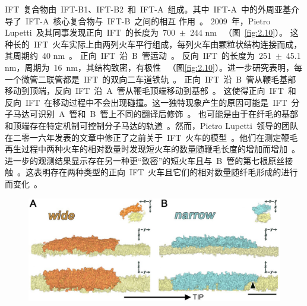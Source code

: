 IFT\ 复合物由\ IFT-B1、IFT-B2\ 和\ IFT-A\ 组成。其中\ IFT-A\ 中的外周亚基介导了\ IFT-A\ 核心复合物与\ IFT-B\ 之间的相互
作用\ \citep{Toriyama2016}。
2009\ 年，Pietro Lupetti\ 及其同事发现正向\ IFT\ 的长度为\ 700\ $\pm$\ 244 nm\ \citep{Pigino2009}
（图\ \ref{fig:2.10}）。 这种长的\ IFT\ 火车实际上由两列火车平行组成，每列火车由颗粒状结构连接而成，其周期约\ 40 nm\ \citep{Pigino2009}。 正向\ IFT\ 沿\ B\ 管运动\ \citep{Pigino2009,Stepanek2016}。 反向\ IFT\ 的长度为\ 251\ $\pm$\ 45.1 nm，周期为\ \SI{16}{\nm}，其结构致密，有极性\ \citep{Pigino2009} （图\ref{fig:2.10}）。进一步研究表明，每一个微管二联管都是\ IFT\ 的双向二车道铁轨\ \citep{Stepanek2016}。 正向\ IFT\ 沿\ B\ 管从鞭毛基部移动到顶端，反向\ IFT\ 沿\ A\ 管从鞭毛顶端移动到基部\ \citep{Stepanek2016}。 这使得正向\ IFT\ 和反向\ IFT\ 在移动过程中不会出现碰撞。这一独特现象产生的原因可能是\ IFT\ 分子马达可识别\ A\ 管和\ B\ 管上不同的翻译后修饰\ \citep{Stepanek2016}。 也可能是由于在纤毛的基部和顶端存在特定机制可控制分子马达的轨道\
\citep{Stepanek2016}。然而，Pietro Lupetti\ 领导的团队在二零一六年发表的文章中修正了之前关于\ IFT\ 火车的模型\ \citep{Vannuccini2016}。他们在测定鞭毛再生过程中两种火车的相对数量时发现短火车的数量随鞭毛长度的增加而增加\ \citep{Vannuccini2016}。进一步的观测结果显示存在另一种更“致密”的短火车且与\ B\ 管的第七根原丝接触\ \citep{Vannuccini2016}。这表明存在两种类型的正向\ IFT\ 火车且它们的相对数量随纤毛形成的进行而变化\
\citep{Vannuccini2016}。

\begin{figure}[htb]
\centering
\graphicspath{{figures/}}
\includegraphics[width=\textwidth]{fig2-11.jpg}
{
\par}
\end{figure}

